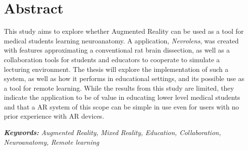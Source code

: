 \section*{Abstract}


This study aims to explore whether Augmented Reality can be used as a tool for medical students learning neuroanatomy. A application, \textit{Nevrolens}, was created with features approximating a conventional rat brain dissection, as well as a collaboration tools for students and educators to cooperate to simulate a lecturing environment. 
The thesis will explore the implementation of such a system, as well as how it performs in educational settings, and its possible use as a tool for remote learning.
While the results from this study are limited, they indicate the application to be of value in educating lower level medical students and that a AR system of this scope can be simple in use even for users with no prior experience with AR devices.
\newline

\textit{
\textbf{Keywords:} Augmented Reality, Mixed Reality, Education, Collaboration, Neuroanatomy, Remote learning
}

